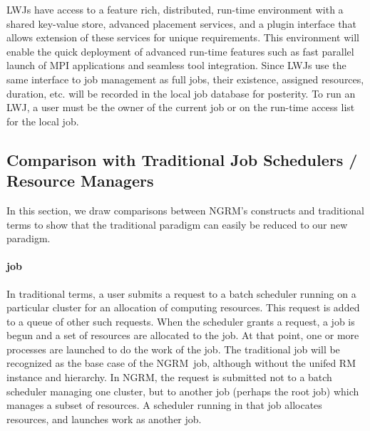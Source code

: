 \documentclass[10pt]{article}
\newcommand{\ngrm}{NGRM}
\begin{document}
LWJs have access to a feature rich, distributed,
run-time environment with a shared key-value store, advanced
placement services, and a plugin interface that allows extension
of these services for unique requirements. This environment will
enable the quick deployment of advanced run-time features such as
fast parallel launch of MPI applications and seamless tool integration. 
Since LWJs use the same interface to job management as full
jobs, their existence, assigned resources, duration, etc.
will be recorded in the local job database for posterity.
To run an LWJ, a user must be the owner of the current
job or on the run-time access list for the local job.

\subsection{Comparison with Traditional Job Schedulers / Resource Managers}

In this section, we draw comparisons between \ngrm's constructs and traditional terms
to show that the traditional paradigm can easily be reduced to our new paradigm. 
\paragraph{job} In traditional terms, a user submits a request to a batch scheduler running on a particular cluster
for an allocation of computing resources.  This request is added to a
queue of other such requests.  When the scheduler grants a request, a
job is begun and a set of resources are allocated to the job.  At that
point, one or more processes are launched to do the work of the job.
The traditional job will be recognized as the base case of the \ngrm\ job,
although without the unifed RM instance and hierarchy. 
In \ngrm, the request is submitted not to a batch scheduler managing one
cluster, but to another job (perhaps the root job) which manages a subset
of resources.
A scheduler running in that job allocates resources, and launches work as
another job.
\end{document}
